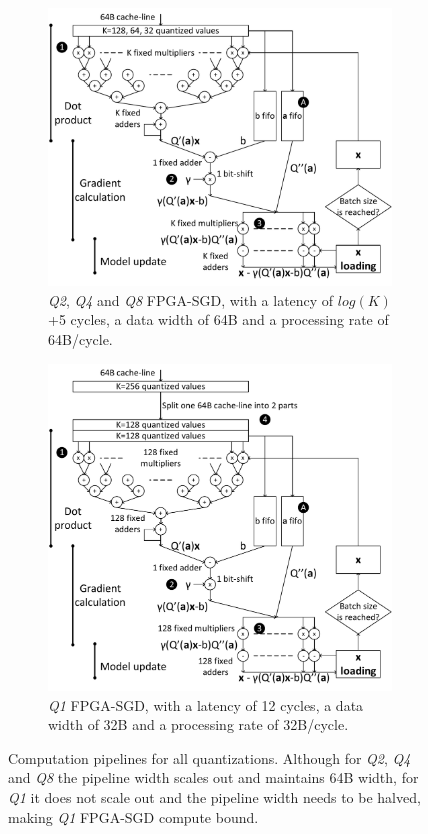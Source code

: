 \documentclass{article}
\begin{document}
\begin{figure}[t]
\centering
\begin{subfigure}[t]{.6\columnwidth}
\centering
\includegraphics[width=\columnwidth]{Figures/qFPGASGD-eps-converted-to.pdf}
\caption{\textit{Q2}, \textit{Q4} and \textit{Q8} FPGA-SGD, with a latency of $log(K)$+5 cycles, a data width of 64B and a processing rate of 64B/cycle.}
\label{fig:qFPGASGD}
\end{subfigure}
\quad
\begin{subfigure}[t]{.6\columnwidth}
\centering
\includegraphics[width=\columnwidth]{Figures/q1FPGASGD-eps-converted-to.pdf}
\caption{\textit{Q1} FPGA-SGD, with a latency of 12 cycles, a data width of 32B and a processing rate of 32B/cycle.}
\label{fig:q1FPGASGD}
\end{subfigure}
\caption{Computation pipelines for all quantizations. Although for \textit{Q2}, \textit{Q4} and \textit{Q8} the pipeline width scales out and maintains 64B width, for \textit{Q1} it does not scale out and the pipeline width needs to be halved, making \textit{Q1} FPGA-SGD compute bound.}
\label{fig:qallFPGASGD}
\end{figure}
\end{document}
